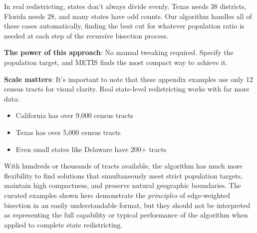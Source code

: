 \documentclass[11pt]{article}
\begin{document}
In real redistricting, states don't always divide evenly. Texas needs 38 districts, Florida needs 28, and many states have odd counts. Our algorithm handles all of these cases automatically, finding the best cut for whatever population ratio is needed at each step of the recursive bisection process.

\textbf{The power of this approach}: No manual tweaking required. Specify the population target, and METIS finds the most compact way to achieve it.

\textbf{Scale matters}: It's important to note that these appendix examples use only 12 census tracts for visual clarity. Real state-level redistricting works with far more data:
\begin{itemize}
\item California has over 9,000 census tracts
\item Texas has over 5,000 census tracts
\item Even small states like Delaware have 200+ tracts
\end{itemize}

With hundreds or thousands of tracts available, the algorithm has much more flexibility to find solutions that simultaneously meet strict population targets, maintain high compactness, and preserve natural geographic boundaries. The curated examples shown here demonstrate the \textit{principles} of edge-weighted bisection in an easily understandable format, but they should not be interpreted as representing the full capability or typical performance of the algorithm when applied to complete state redistricting.
\end{document}
